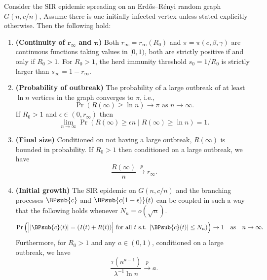 \documentclass[11pt]{article}
\begin{document}
\begin{theorem}\label{thm:single-comm}
Consider the SIR epidemic spreading on an Erd\H{o}s--R\'enyi random graph $G(n, c/n)$,  Assume there is one initially infected vertex unless stated explicitly otherwise.
Then the following hold:
\begin{enumerate}[label=(\alph*)]
    \item\textbf{(Continuity of $\mathbf r_\infty$ and $\mathbf \pi$)} Both $r_\infty=r_\infty(R_0)$  and $\pi=\pi(c,\beta,\gamma)$ are continuous functions taking values in $[0,1)$,  both are strictly positive if and only if $R_0> 1$. For $R_0>1$, the  herd immunity threshold $s_0=1/R_0$ is strictly larger than $s_\infty=1-r_\infty$.
    
    \item \label{bullet:single_comm_prob_outbreak}\textbf{(Probability of outbreak)} The probability of a large outbreak of at least $\ln n$ vertices in the graph converges to $\pi$, i.e., 
    \begin{equation}
        \Pr(R(\infty) \ge \ln n) \to \pi \text{ as }n\to\infty.
    \end{equation}
    If $R_0>1$ and $\epsilon\in (0,r_\infty)$ then
    \begin{equation}
        \lim_{n\to\infty} \Pr(R(\infty) \ge \epsilon n \mid R(\infty) \ge \ln n) = 1.
    \end{equation}

    \item \textbf{(Final size)} \label{bullet:single_comm_final_size}
   Conditioned on not having a large outbreak, $R(\infty)$ 
     is bounded in probability.  If $R_0>1$ then conditioned
  on a large outbreak, we have
    \begin{equation*}
        \frac{R(\infty)}{n} \overset{p}{\to} r_\infty.
    \end{equation*}

    \item\textbf{(Initial growth)}\label{bullet:single_comm_init_growth}
    The SIR epidemic on $G(n,c/n)$ and the branching  processes $\BPsub{c}$  and $\BPsub{c(1-\epsilon)}(t)$ can be coupled in such a way that the following holds whenever $N_n=o(\sqrt n)$.  
        \[
            \Pr\left(\Big||\BPsub{c}(t)| = (I(t)+R(t))\Big| \text{ for all } t \text{ s.t. } |\BPsub{c}(t)| \leq N_n)\right) \to 1\quad\text{as}\quad n\to \infty.
        \]
        Furthermore, 
    for $R_0>1$ and any $a\in(0,1)$, conditioned on a large outbreak, we have 
    \begin{equation*}
        \frac{\tau(n^{a-1})}{\lambda^{-1}\ln n} \overset{p}{\to} a.
    \end{equation*}



\end{enumerate}
\end{theorem}
\end{document}
